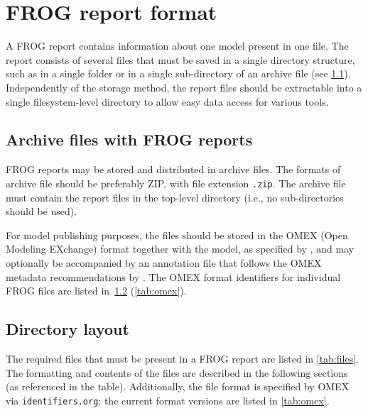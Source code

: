\chapter{FROG report format}
\label{chap:spec}

A FROG report contains information about one model present in one file.
The report consists of several files that must be saved in a single directory structure, such as in a single folder or in a single sub-directory of an archive file (see \cref{sec:archives}).
Independently of the storage method, the report files should be extractable into a single filesystem-level directory to allow easy data access for various tools.

\section{Archive files with FROG reports}
\label{sec:archives}

FROG reports may be stored and distributed in archive files. The formats of archive file should be preferably ZIP, with file extension \texttt{.zip}. The archive file must contain the report files in the top-level directory (i.e., no sub-directories should be used).

For model publishing purposes, the files should be stored in the OMEX (Open Modeling EXchange) format together with the model, as specified by \citeauthor{bergmann2014omex}, and may optionally be accompanied by an annotation file that follows the OMEX metadata recommendations by \citeauthor{Neal2018}.
The OMEX format identifiers for individual FROG files are listed in~\cref{sec:files} (\cref{tab:omex}).

\section{Directory layout}
\label{sec:files}

The required files that must be present in a FROG report are listed in \cref{tab:files}.
The formatting and contents of the files are described in the following sections (as referenced in the table). Additionally, the file format is specified by OMEX via \texttt{identifiers.org}; the current format versions are listed in \cref{tab:omex}.

